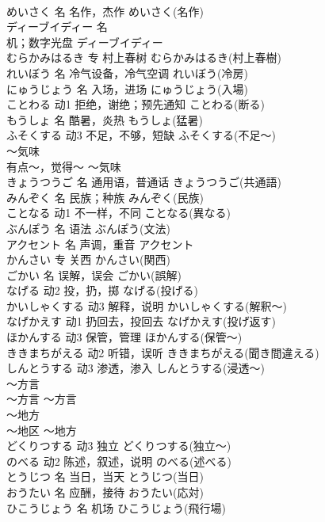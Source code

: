 \documentclass[8pt]{extreport}
\begin{document}
\begin{CJK}{UTF8}{min}
\\	めいさく	名	名作，杰作	めいさく(名作)	
\\	ディーブイディー	名	
\\	机；数字光盘	ディーブイディー
\\	むらかみはるき	专	村上春树	むらかみはるき(村上春樹)	
\\	れいぼう	名	冷气设备，冷气空调	れいぼう(冷房)	
\\	にゅうじょう	名	入场，进场	にゅうじょう(入場)	
\\	ことわる	动1	拒绝，谢绝；预先通知	ことわる(断る)	
\\	もうしょ	名	酷暑，炎热	もうしょ(猛暑)	
\\	ふそくする	动3	不足，不够，短缺	ふそくする(不足～)	
\\	～気味	
\\	有点～，觉得～	～気味	
\\	きょうつうご	名	通用语，普通话	きょうつうご(共通語)	
\\	みんぞく	名	民族；种族	みんぞく(民族)	
\\	ことなる	动1	不一样，不同	ことなる(異なる)	
\\	ぶんぽう	名	语法	ぶんぽう(文法)	
\\	アクセント	名	声调，重音	アクセント	
\\	かんさい	专	关西	かんさい(関西)	
\\	ごかい	名	误解，误会	ごかい(誤解)	
\\	なげる	动2	投，扔，掷	なげる(投げる)	
\\	かいしゃくする	动3	解释，说明	かいしゃくする(解釈～)	
\\	なげかえす	动1	扔回去，投回去	なげかえす(投げ返す)	
\\	ほかんする	动3	保管，管理	ほかんする(保管～)	
\\	ききまちがえる	动2	听错，误听	ききまちがえる(聞き間違える)	
\\	しんとうする	动3	渗透，渗入	しんとうする(浸透～)	
\\	～方言	
\\	～方言	～方言	
\\	～地方	
\\	～地区	～地方	
\\	どくりつする	动3	独立	どくりつする(独立～)	
\\	のべる	动2	陈述，叙述，说明	のべる(述べる)	
\\	とうじつ	名	当日，当天	とうじつ(当日)	
\\	おうたい	名	应酬，接待	おうたい(応対)	
\\	ひこうじょう	名	机场	ひこうじょう(飛行場)	

\end{CJK}
\end{document}
